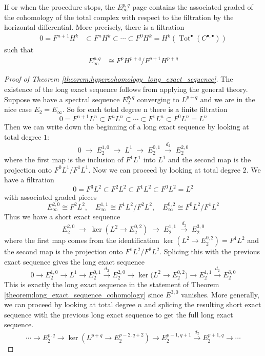 \documentclass[12pt]{article}
\begin{document}
\begin{theorem}
    If or when the procedure stops, the $E^{p,q}_{\infty}$ page contains the associated graded of the cohomology of the total complex with respect to the filtration by the horizontal differential. More precisely, there is a filtration \begin{align*}
        0 = F^{n+1}H^k & \subset F^n H^k \subset \cdots \subset F^0 H^k = H^k(\operatorname{Tot}^{\bullet}(C^{\bullet,\bullet}))
    \end{align*} such that \begin{align*}
        E_{\infty}^{p,q} & \cong F^p H^{p+q} / F^{p+1} H^{p+q}
    \end{align*}
\end{theorem}

\begin{proof}
    [Proof of Theorem \ref{theorem:hypercohomology_long_exact_sequence}]
    The existence of the long exact sequence follows from applying the general theory. Suppose we have a spectral sequence $E_2^{p,q}$ converging to $L^{p+q}$ and we are in the nice case $E_2 = E_{\infty}$. So for each total degree n there is a finite filtration
\[0=F^{n+1}L^n\subset F^{n}L^n\subset\cdots\subset F^{1}L^n\subset F^{0}L^n=L^n\] Then we can write down the beginning of a long exact sequence by looking at total degree $1$:
\[
0\;\to\;E_2^{1,0}\;\to\;L^1\;\to\;E_2^{0,1}\;\xrightarrow{d_2}\;E_2^{2,0}\]
where the first map is the inclusion of $F^1L^1$ into $L^1$ and the second map is the projection onto $F^0L^1/F^1L^1$. Now we can proceed by looking at total degree $2$. We have a filtration
\[0=F^{3}L^2\subset F^{2}L^2\subset F^{1}L^2\subset F^{0}L^2=L^2\] with associated graded pieces
\[E_{\infty}^{2,0}\cong F^2L^2,\quad E_{\infty}^{1,1}\cong F^1L^2/F^2L^2,\quad E_{\infty}^{0,2}\cong F^0L^2/F^1L^2\] Thus we have a short exact sequence 
\[
E_2^{2,0}\;\to\;\ker(L^2\to E_2^{0,2})\;\to\;E_2^{1,1}\;\xrightarrow{d_2}\;E_2^{3,0}\] where the first map comes from the identification $\ker (L^2\to E_2^{0,2})=F^1L^2$ and the second map is the projection onto $F^1L^2/F^2L^2$. Splicing this with the previous exact sequence gives the long exact sequence \[0 \to E_2^{1,0} \to L^1 \to E_2^{0,1}
\xrightarrow{d_2}
E_2^{2,0} \to \ker\bigl(L^2 \to E_2^{0,2}\bigr)
\to E_2^{1,1} \xrightarrow{d_2} E_2^{3,0}\]
This is exactly the long exact sequence in the statement of Theorem \ref{theorem:long_exact_sequence_cohomology} since $E^{3,0}$ vanishes. More generally, we can proceed by looking at total degree $n$ and splicing the resulting short exact sequence with the previous long exact sequence to get the full long exact sequence.
\[
\cdots \longrightarrow E_2^{p,q}
\longrightarrow \ker(L^{p+q}\!\to E_2^{p-2,q+2})
\longrightarrow E_2^{p-1,q+1}
\xrightarrow{d_2} E_2^{p+1,q}
\longrightarrow \cdots
\]
\end{proof}
\end{document}
